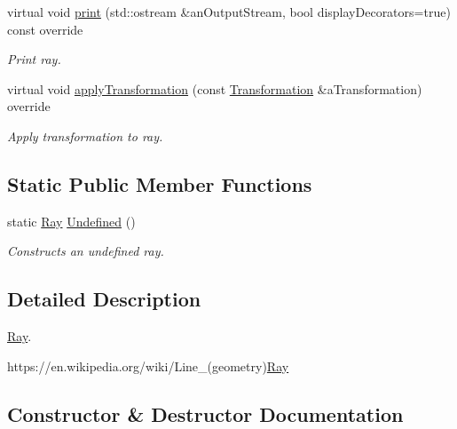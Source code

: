 \begin{DoxyCompactItemize}
virtual void \hyperlink{classostk_1_1math_1_1geom_1_1d3_1_1objects_1_1_ray_af2aed02d301de6d224cc757b7db573a7}{print} (std\+::ostream \&an\+Output\+Stream, bool display\+Decorators=true) const override
\begin{DoxyCompactList}\small\item\em Print ray. \end{DoxyCompactList}\item 
virtual void \hyperlink{classostk_1_1math_1_1geom_1_1d3_1_1objects_1_1_ray_abdbc52aa6745f9d9601a8138a519d828}{apply\+Transformation} (const \hyperlink{classostk_1_1math_1_1geom_1_1d3_1_1_transformation}{Transformation} \&a\+Transformation) override
\begin{DoxyCompactList}\small\item\em Apply transformation to ray. \end{DoxyCompactList}\end{DoxyCompactItemize}
\subsection*{Static Public Member Functions}
\begin{DoxyCompactItemize}
\item 
static \hyperlink{classostk_1_1math_1_1geom_1_1d3_1_1objects_1_1_ray}{Ray} \hyperlink{classostk_1_1math_1_1geom_1_1d3_1_1objects_1_1_ray_a858510b6478f7cb47b763df6c641dfa7}{Undefined} ()
\begin{DoxyCompactList}\small\item\em Constructs an undefined ray. \end{DoxyCompactList}\end{DoxyCompactItemize}


\subsection{Detailed Description}
\hyperlink{classostk_1_1math_1_1geom_1_1d3_1_1objects_1_1_ray}{Ray}. 

https\+://en.wikipedia.\+org/wiki/\+Line\+\_\+(geometry)\hyperlink{classostk_1_1math_1_1geom_1_1d3_1_1objects_1_1_ray_a78335698f8a4f72e613e607b13121df0}{Ray} 

\subsection{Constructor \& Destructor Documentation}
\mbox{\label{classostk_1_1math_1_1geom_1_1d3_1_1objects_1_1_ray_a78335698f8a4f72e613e607b13121df0}} 
